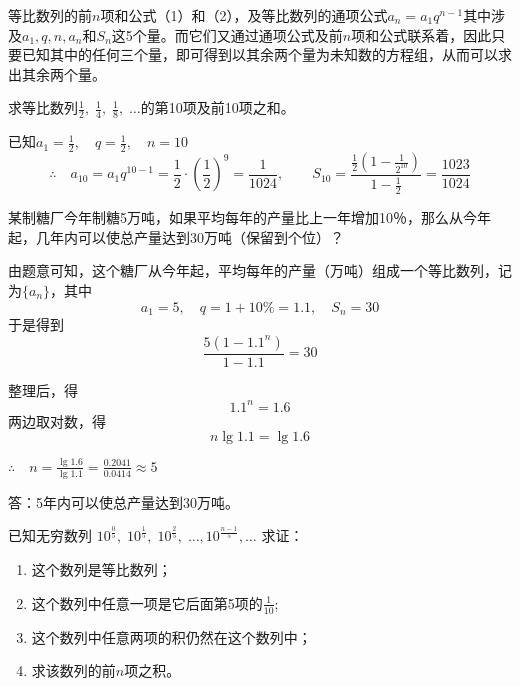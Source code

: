 等比数列的前$n$项和公式（1）和（2），及等比数列的通项公式$a_n=a_1q^{n-1}$其中涉及$a_1, q, n, a_n$和$S_n$这5个量。而它们又通过通项公式及前$n$项和公式联系着，因此只要已知其中的任何三个量，即可得到以其余两个量为未知数的方程组，从而可以求出其余两个量。

\begin{example}
    求等比数列$\frac{1}{2},\; \frac{1}{4},\; \frac{1}{8},\; \ldots$的第10项及前10项之和。
\end{example}

\begin{solution}
已知$a_1=\frac{1}{2},\quad q=\frac{1}{2},\quad n=10$
\[\therefore\quad a_{10}=a_1q^{10-1}=\frac{1}{2}\cdot \left(\frac{1}{2}\right)^9=\frac{1}{1024},\qquad 
S_{10}=\frac{\frac{1}{2}\left(1-\frac{1}{2^{10}}\right)}{1-\frac{1}{2}}=\frac{1023}{1024}\]
\end{solution}

\begin{example}
     某制糖厂今年制糖5万吨，如果平均每年的产量比上一年增加10％，那么从今年起，几年内可以使总产量达到30万吨（保留到个位）？
\end{example}

\begin{solution}
由题意可知，这个糖厂从今年起，平均每年的产量（万吨）组成一个等比数列，记为$\{a_n\}$，其中
\[a_1=5,\quad q=1+10\%=1.1,\quad S_n=30\]
于是得到
\[\frac{5(1-1.1^n)}{1-1.1}=30\]

整理后，得
\[1.1^n=1.6\]
两边取对数，得
\[n\lg 1.1=\lg 1.6\]

$\therefore\quad n=\frac{\lg 1.6}{\lg 1.1}=\frac{0.2041}{0.0414}\approx 5$

答：5年内可以使总产量达到30万吨。
\end{solution}

\begin{example}
    已知无穷数列
$10^{\tfrac{0}{5}},\; 10^{\tfrac{1}{5}},\; 10^{\tfrac{2}{5}},\; \ldots,10^{\tfrac{n-1}{5}},\ldots$
求证：
\begin{enumerate}[(1)]
\item 这个数列是等比数列；
\item 这个数列中任意一项是它后面第5项的$\frac{1}{10}$;
\item 这个数列中任意两项的积仍然在这个数列中；
\item 求该数列的前$n$项之积。
\end{enumerate}
\end{example}

